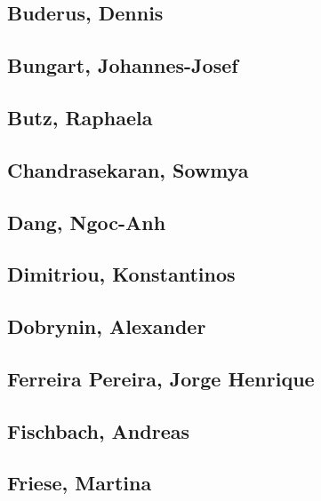 \subsection{Buderus, Dennis}\label{buderus-dennis}

\subsection{Bungart, Johannes-Josef}\label{bungart-johannes-josef}

\subsection{Butz, Raphaela}\label{butz-raphaela}

\subsection{Chandrasekaran, Sowmya}\label{chandrasekaran-sowmya}

\subsection{Dang, Ngoc-Anh}\label{dang-ngoc-anh}

\subsection{Dimitriou, Konstantinos}\label{dimitriou-konstantinos}

\subsection{Dobrynin, Alexander}\label{dobrynin-alexander}

\subsection{Ferreira Pereira, Jorge
Henrique}\label{ferreira-pereira-jorge-henrique}

\subsection{Fischbach, Andreas}\label{fischbach-andreas}

\subsection{Friese, Martina}\label{friese-martina}

